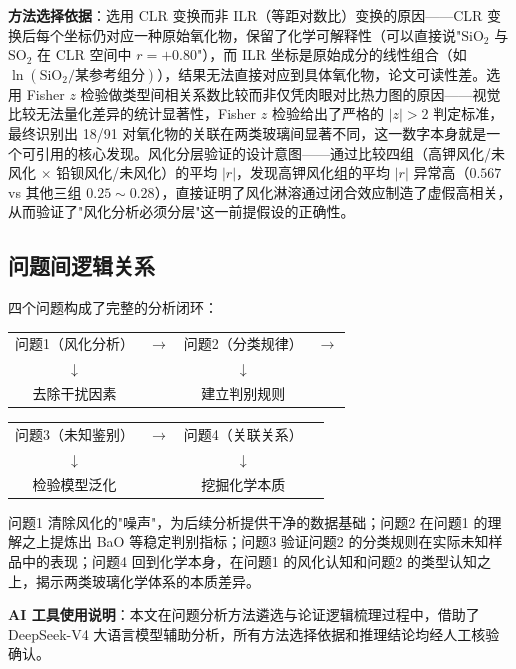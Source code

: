 \textbf{方法选择依据}：选用 CLR 变换而非 ILR（等距对数比）变换的原因——CLR 变换后每个坐标仍对应一种原始氧化物，保留了化学可解释性（可以直接说"$\text{SiO}_2$ 与 $\text{SO}_2$ 在 CLR 空间中 $r = +0.80$"），而 ILR 坐标是原始成分的线性组合（如 $\ln(\text{SiO}_2/\text{某参考组分})$），结果无法直接对应到具体氧化物，论文可读性差。选用 Fisher $z$ 检验做类型间相关系数比较而非仅凭肉眼对比热力图的原因——视觉比较无法量化差异的统计显著性，Fisher $z$ 检验给出了严格的 $|z| > 2$ 判定标准，最终识别出 18/91 对氧化物的关联在两类玻璃间显著不同，这一数字本身就是一个可引用的核心发现。风化分层验证的设计意图——通过比较四组（高钾风化/未风化 $\times$ 铅钡风化/未风化）的平均 $|r|$，发现高钾风化组的平均 $|r|$ 异常高（$0.567$ vs 其他三组 $0.25\sim0.28$），直接证明了风化淋溶通过闭合效应制造了虚假高相关，从而验证了"风化分析必须分层"这一前提假设的正确性。

\subsection{问题间逻辑关系}

四个问题构成了完整的分析闭环：

\begin{center}
\begin{tabular}{cccc}
    问题1（风化分析） & $\rightarrow$ & 问题2（分类规律） & $\rightarrow$ \\
    $\downarrow$ & & $\downarrow$ & \\
    去除干扰因素 & & 建立判别规则 & \\
\end{tabular}
\begin{tabular}{cccc}
    问题3（未知鉴别） & $\rightarrow$ & 问题4（关联关系） \\
    $\downarrow$ & & $\downarrow$ \\
    检验模型泛化 & & 挖掘化学本质 \\
\end{tabular}
\end{center}

问题1 清除风化的"噪声"，为后续分析提供干净的数据基础；问题2 在问题1 的理解之上提炼出 BaO 等稳定判别指标；问题3 验证问题2 的分类规则在实际未知样品中的表现；问题4 回到化学本身，在问题1 的风化认知和问题2 的类型认知之上，揭示两类玻璃化学体系的本质差异。

\vspace{0.5cm}
\noindent\textbf{AI 工具使用说明}：本文在问题分析方法遴选与论证逻辑梳理过程中，借助了 DeepSeek-V4 大语言模型辅助分析，所有方法选择依据和推理结论均经人工核验确认。
